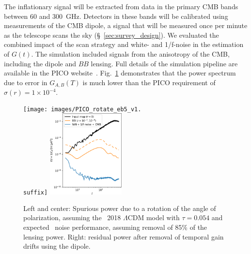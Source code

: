 \documentclass[PICOReport.tex]{subfiles}
\begin{document}
The inflationary signal will be extracted from data in the primary CMB bands between 60 and 300~GHz. Detectors in these bands will be calibrated using measurements of the CMB dipole, a signal that will be measured once per minute as the telescope scans the sky (\S~\ref{sec:survey_design}).  We evaluated the combined impact of the scan strategy and white- and 1/f-noise in the estimation of $G(t)$.
The simulation included signals from the anisotropy of the CMB, including the dipole and $BB$ lensing. Full details of the simulation pipeline are available in the PICO website~\citep{pico_web}. Fig.~\ref{fig:rot_bb_tb_eb} demonstrates that the power spectrum due to error in $G_{A,B} (T)$ is much lower than the PICO requirement of $\sigma(r) = 1\times 10^{-4}$. 
\begin{figure}[thb]
\texttt{[image: images/PICO\_rotate\_eb5\_v1.\\suffix]} 
\includegraphics[width=0.35\textwidth]{images/calibration_spectrum_BB.pdf}
\caption{\captiontext
Left and center: Spurious power due to a rotation of the angle of polarization, assuming the \planck~2018 $\Lambda$CDM model \citep{Planck2018_VI} with $\tau=0.054$ and expected \pico\ noise performance, assuming removal of 85\% of the lensing power.  Right: residual power after removal of temporal gain drifts using the dipole.
\label{fig:rot_bb_tb_eb} }
\end{figure}


\end{document}
